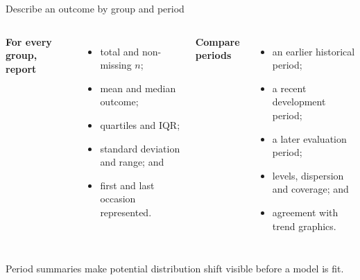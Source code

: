 \documentclass[10pt,aspectratio=169]{beamer}
\begin{document}
\begin{frame}{Describe an outcome by group and period}

\small

\begin{columns}[T]


\textbf{For every group, report}

\begin{itemize}
  \item total and non-missing $n$;
  \item mean and median outcome;
  \item quartiles and IQR;
  \item standard deviation and range; and
  \item first and last occasion represented.
\end{itemize}


\textbf{Compare periods}

\begin{itemize}
  \item an earlier historical period;
  \item a recent development period;
  \item a later evaluation period;
  \item levels, dispersion and coverage; and
  \item agreement with trend graphics.
\end{itemize}

\end{columns}

\vspace{0.30cm}

\centering
\textcolor{ukudlaRed}{Period summaries make potential distribution shift visible before a model is fit.}

\end{frame}
\end{document}
